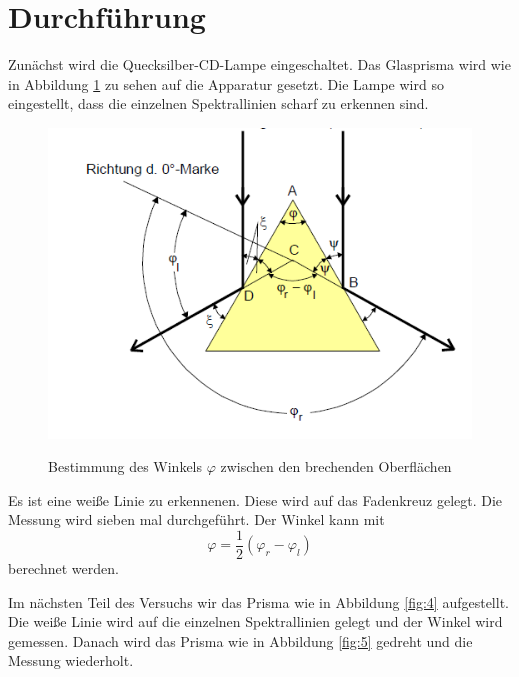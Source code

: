 \section{Durchführung}
Zunächst wird die Quecksilber-CD-Lampe eingeschaltet.
Das Glasprisma wird wie in Abbildung \ref{fig:6} zu sehen auf die Apparatur gesetzt.
Die Lampe wird so eingestellt, dass die einzelnen Spektrallinien scharf zu erkennen sind.
\begin{figure}[H]
\centering
\includegraphics[width=\textwidth]{6.png}
\caption{Bestimmung des Winkels $\varphi$ zwischen den brechenden Oberflächen}\cite{anleitung}
\label{fig:6}
\end{figure}
Es ist eine weiße Linie zu erkennenen.
Diese wird auf das Fadenkreuz gelegt.
Die Messung wird sieben mal durchgeführt.
Der Winkel kann mit
\begin{equation}
  \varphi = \frac{1}{2}(\varphi_r-\varphi_l)
  \label{eqn:phi}
\end{equation}
berechnet werden.

Im nächsten Teil des Versuchs wir das Prisma wie in Abbildung \ref{fig:4} aufgestellt.
Die weiße Linie wird auf die einzelnen Spektrallinien gelegt und der Winkel wird gemessen.
Danach wird das Prisma wie in Abbildung \ref{fig:5} gedreht und die Messung wiederholt.

